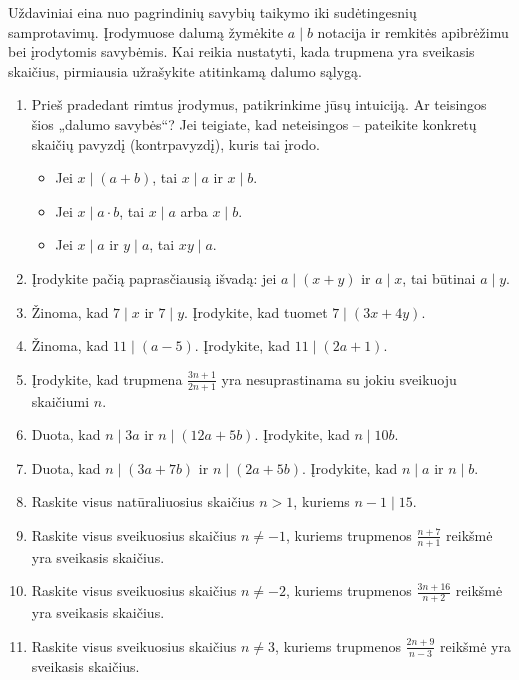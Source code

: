 \documentclass[11pt,a4paper]{scrartcl}
\begin{document}
Uždaviniai eina nuo pagrindinių savybių taikymo iki sudėtingesnių samprotavimų. Įrodymuose dalumą žymėkite \(a\mid b\) notacija ir remkitės apibrėžimu bei įrodytomis savybėmis. Kai reikia nustatyti, kada trupmena yra sveikasis skaičius, pirmiausia užrašykite atitinkamą dalumo sąlygą.

\begin{enumerate}
    \renewcommand{\labelenumi}{\textbf{\theenumi.}}
    \item Prieš pradedant rimtus įrodymus, patikrinkime jūsų intuiciją. Ar teisingos šios „dalumo savybės“? Jei teigiate, kad neteisingos – pateikite konkretų skaičių pavyzdį (kontrpavyzdį), kuris tai įrodo.
    \begin{itemize}
        \item[a)] Jei \(x \mid (a+b)\), tai \(x \mid a\) ir \(x \mid b\).
        \item[b)] Jei \(x \mid a \cdot b\), tai \(x \mid a\) arba \(x \mid b\).
        \item[c)] Jei \(x \mid a\) ir \(y \mid a\), tai \(xy \mid a\).
    \end{itemize}
    \item Įrodykite pačią paprasčiausią išvadą: jei \(a \mid (x+y)\) ir \(a \mid x\), tai būtinai \(a \mid y\).
    \item Žinoma, kad \(7 \mid x\) ir \(7 \mid y\). Įrodykite, kad tuomet \(7 \mid (3x + 4y)\).
    \item Žinoma, kad \(11 \mid (a - 5)\). Įrodykite, kad \(11 \mid (2a + 1)\).
    \item Įrodykite, kad trupmena \(\frac{3n + 1}{2n + 1}\) yra nesuprastinama su jokiu sveikuoju skaičiumi \(n\).
    \item Duota, kad \(n \mid 3a\) ir \(n \mid (12a+5b)\). Įrodykite, kad \(n \mid 10b\).
    \item Duota, kad \(n \mid (3a+7b)\) ir \(n \mid (2a+5b)\). Įrodykite, kad \(n \mid a\) ir \(n \mid b\).
    \item Raskite visus natūraliuosius skaičius \(n>1\), kuriems \(n-1 \mid 15\).
    \item Raskite visus sveikuosius skaičius \(n\ne-1\), kuriems trupmenos \(\frac{n+7}{n+1}\) reikšmė yra sveikasis skaičius.
    \item Raskite visus sveikuosius skaičius \(n\ne-2\), kuriems trupmenos \(\frac{3n+16}{n+2}\) reikšmė yra sveikasis skaičius.
    \item Raskite visus sveikuosius skaičius \(n\ne3\), kuriems trupmenos \(\frac{2n+9}{n-3}\) reikšmė yra sveikasis skaičius.
\end{enumerate}
\end{document}
